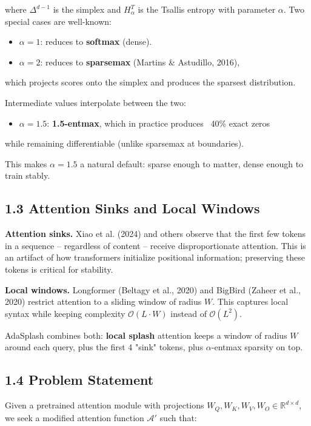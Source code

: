 where $\Delta^{d-1}$ is the simplex and $H_\alpha^T$ is the Tsallis entropy 
with parameter $\alpha$. Two special cases are well-known:

\begin{itemize}
\item $\alpha = 1$: reduces to \textbf{softmax} (dense).
\item $\alpha = 2$: reduces to \textbf{sparsemax} (Martins \& Astudillo, 2016),
\end{itemize}
  which projects scores onto the simplex and produces the sparsest 
  distribution.

Intermediate values interpolate between the two:

\begin{itemize}
\item $\alpha = 1.5$: \textbf{1.5-entmax}, which in practice produces ~40\% exact zeros
\end{itemize}
  while remaining differentiable (unlike sparsemax at boundaries).

This makes $\alpha = 1.5$ a natural default: sparse enough to matter, dense 
enough to train stably.

\subsection{1.3 Attention Sinks and Local Windows}

\textbf{Attention sinks.} Xiao et al. (2024) and others observe that the first 
few tokens in a sequence -- regardless of content -- receive disproportionate 
attention. This is an artifact of how transformers initialize positional 
information; preserving these tokens is critical for stability.

\textbf{Local windows.} Longformer (Beltagy et al., 2020) and BigBird (Zaheer et al., 
2020) restrict attention to a sliding window of radius $W$. This captures 
local syntax while keeping complexity $\mathcal{O}(L \cdot W)$ instead of 
$\mathcal{O}(L^2)$.

AdaSplash combines both: \textbf{local splash} attention keeps a window of radius 
$W$ around each query, plus the first 4 "sink" tokens, plus $\alpha$-entmax 
sparsity on top.

\subsection{1.4 Problem Statement}

Given a pretrained attention module with projections 
$W_Q, W_K, W_V, W_O \in \mathbb{R}^{d \times d}$, we seek a modified attention 
function $\mathcal{A}'$ such that:


